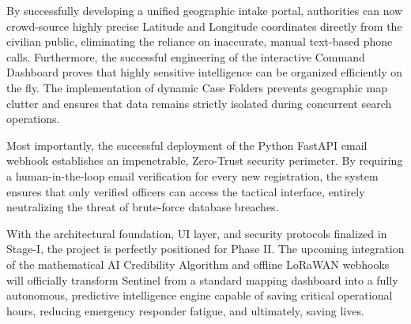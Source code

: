\documentclass[12pt,a4paper]{report}
\begin{document}
By successfully developing a unified geographic intake portal, authorities can now crowd-source highly precise Latitude and Longitude coordinates directly from the civilian public, eliminating the reliance on inaccurate, manual text-based phone calls. Furthermore, the successful engineering of the interactive Command Dashboard proves that highly sensitive intelligence can be organized efficiently on the fly. The implementation of dynamic Case Folders prevents geographic map clutter and ensures that data remains strictly isolated during concurrent search operations.

Most importantly, the successful deployment of the Python FastAPI email webhook establishes an impenetrable, Zero-Trust security perimeter. By requiring a human-in-the-loop email verification for every new registration, the system ensures that only verified officers can access the tactical interface, entirely neutralizing the threat of brute-force database breaches.

With the architectural foundation, UI layer, and security protocols finalized in Stage-I, the project is perfectly positioned for Phase II. The upcoming integration of the mathematical AI Credibility Algorithm and offline LoRaWAN webhooks will officially transform Sentinel from a standard mapping dashboard into a fully autonomous, predictive intelligence engine capable of saving critical operational hours, reducing emergency responder fatigue, and ultimately, saving lives.
\end{document}
